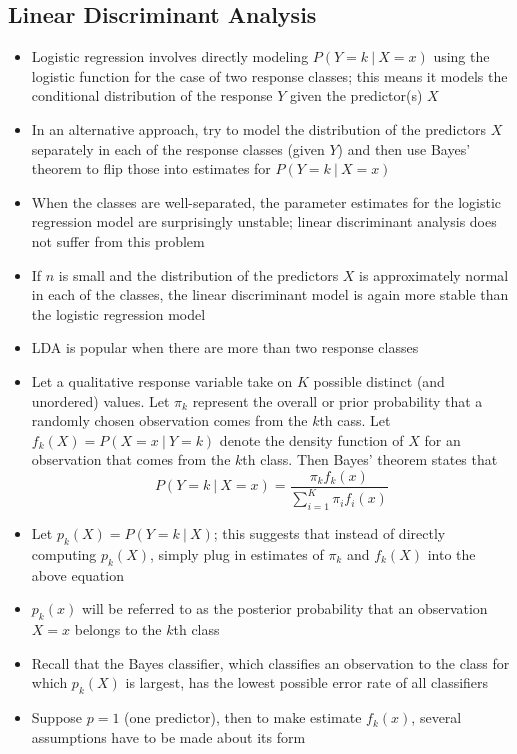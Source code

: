 \documentclass[12pt]{article}
\begin{document}
\subsection{Linear Discriminant Analysis} 
\begin{itemize} 
\item Logistic regression involves directly modeling $P(Y=k~|~X=x)$ using the logistic function for the case of two response classes; this means it models the conditional distribution of the response $Y$ given the predictor(s) $X$ 
\item In an alternative approach, try to model the distribution of the predictors $X$ separately in each of the response classes (given $Y$) and then use Bayes' theorem to flip those into estimates for $P(Y=k~|~X=x)$ 
\item When the classes are well-separated, the parameter estimates for the logistic regression model are surprisingly unstable; linear discriminant analysis does not suffer from this problem
\item If $n$ is small and the distribution of the predictors $X$ is approximately normal in each of the classes, the linear discriminant model is again more stable than the logistic regression model
\item LDA is popular when there are more than two response classes 
\item Let a qualitative response variable take on $K$ possible distinct (and unordered) values. Let $\pi_k$ represent the overall or prior probability that a randomly chosen observation comes from the $k$th cass. Let $f_k(X) = P(X=x~|~Y=k)$ denote the density function of $X$ for an observation that comes from the $k$th class. Then Bayes' theorem states that 
$$ P(Y=k~|~X=x) = \frac{\pi_kf_k(x)}{\sum_{i=1}^K \pi_i f_i(x)} $$ 
\item Let $p_k(X) = P(Y=k~|~X)$; this suggests that instead of directly computing $p_k(X)$, simply plug in estimates of $\pi_k$ and $f_k(X)$ into the above equation 
\item $p_k(x)$ will be referred to as the posterior probability that an observation $X=x$ belongs to the $k$th class 
\item Recall that the Bayes classifier, which classifies an observation to the class for which $p_k(X)$ is largest, has the lowest possible error rate of all classifiers 
\item Suppose $p=1$ (one predictor), then to make estimate $f_k(x)$, several assumptions have to be made about its form \begin{itemize}

\end{itemize}
\end{itemize}
\end{document}
